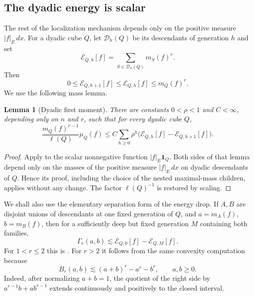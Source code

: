 \documentclass[10pt,a4paper]{amsart}
\numberwithin{equation}{section}
\newtheorem{lemma}[theorem]{Lemma}
\newcommand{\cD}{\mathcal D}
\begin{document}
\subsection{The dyadic energy is scalar}
The rest of the localization mechanism depends only on the positive measure
$|f|_E\,dx$.  For a dyadic cube $Q$, let $\cD_h(Q)$ be its descendants of
generation $h$ and set
\begin{equation}\label{eq:energy}
 \mathcal E_{Q,h}[f]
 =\sum_{S\in\cD_h(Q)}m_S(f)^r.
\end{equation}
Then
\begin{equation}\label{eq:energy-monotone}
 0\le\mathcal E_{Q,h+1}[f]\le\mathcal E_{Q,h}[f]
 \le m_Q(f)^r.
\end{equation}
We use the following mass lemma.

\begin{lemma}[Dyadic first moment]\label{lem:dyadic-first-moment}
There are constants $0<\rho<1$ and $C<\infty$, depending only on $n$ and
$r$, such that for every dyadic cube $Q$,
\begin{equation}\label{eq:dyadic-first-moment}
 \frac{m_Q(f)^{r-1}}{\ell(Q)}\mu_Q(f)
 \le C\sum_{h\ge0}\rho^h
 \bigl(\mathcal E_{Q,h}[f]-\mathcal E_{Q,h+1}[f]\bigr).
\end{equation}
\end{lemma}

\begin{proof}
Apply \cite[Lemma~4.2]{Stolyarov24} to the scalar nonnegative function
$|f|_E\mathbf1_Q$.  Both sides of that lemma depend only on the masses of the
positive measure $|f|_E\,dx$ on dyadic descendants of $Q$.  Hence its proof,
including the choice of the nested maximal-mass children, applies without any
change.  The factor $\ell(Q)^{-1}$ is restored by scaling.
\end{proof}

We shall also use the elementary separation form of the energy drop.  If
$A,B$ are disjoint unions of descendants at one fixed generation of $Q$, and
$a=m_A(f)$, $b=m_B(f)$, then for a sufficiently deep but fixed generation
$M$ containing both families,
\begin{equation}\label{eq:separated-energy}
 \Gamma_r(a,b)
 \lesssim \mathcal E_{Q,0}[f]-\mathcal E_{Q,M}[f].
\end{equation}
For $1<r\le2$ this is \cite[Lemma~6.7]{Stolyarov24}.  For $r>2$ it follows
from the same convexity computation because
\begin{equation}\label{eq:Br-convexity}
 B_r(a,b)\lesssim (a+b)^r-a^r-b^r,
 \qquad a,b\ge0.
\end{equation}
Indeed, after normalizing $a+b=1$, the quotient of the right side by
$a^{r-1}b+ab^{r-1}$ extends continuously and positively to the closed
interval.
\end{document}

